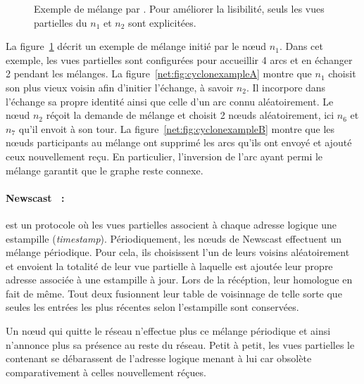\begin{figure}
  \centering
  \hspace{35pt}
  \caption[Exemple de mélange par \CYCLON]
  {\label{net:fig:cyclonexample} Exemple de mélange par \CYCLON. Pour
    améliorer la lisibilité, seuls les vues partielles du $n_1$ et $n_2$ sont
    explicitées.}
\end{figure}
  
\noindent La figure~\ref{net:fig:cyclonexample} décrit un exemple de mélange
initié par le nœud $n_1$. Dans cet exemple, les vues partielles sont configurées
pour accueillir 4 arcs et en échanger 2 pendant les mélanges. La
figure~\ref{net:fig:cyclonexampleA} montre que $n_1$ choisit son plus vieux
voisin afin d'initier l'échange, à savoir $n_2$. Il incorpore dans l'échange sa
propre identité ainsi que celle d'un arc connu aléatoirement. Le nœud $n_2$
réçoit la demande de mélange et choisit 2 nœuds aléatoirement, ici $n_6$ et
$n_7$ qu'il envoit à son tour. La figure~\ref{net:fig:cyclonexampleB} montre que
les nœuds participants au mélange ont supprimé les arcs qu'ils ont envoyé et
ajouté ceux nouvellement reçu. En particulier, l'inversion de l'arc ayant permi
le mélange garantit que le graphe reste connexe.

\paragraph{Newscast~\cite{tolgyeski2009adaptive} :} est un protocole où les vues
partielles associent à chaque adresse logique une estampille
(\emph{timestamp}). Périodiquement, les nœuds de Newscast effectuent un mélange
périodique. Pour cela, ils choisissent l'un de leurs voisins aléatoirement et
envoient la totalité de leur vue partielle à laquelle est ajoutée leur propre
adresse associée à une estampille à jour. Lors de la récéption, leur homologue
en fait de même. Tout deux fusionnent leur table de voisinnage de telle sorte
que seules les entrées les plus récentes selon l'estampille sont conservées.

\noindent Un nœud qui quitte le réseau n'effectue plus ce mélange périodique et
ainsi n'annonce plus sa présence au reste du réseau. Petit à petit, les vues
partielles le contenant se débarassent de l'adresse logique menant à lui car
obsolète comparativement à celles nouvellement réçues.

